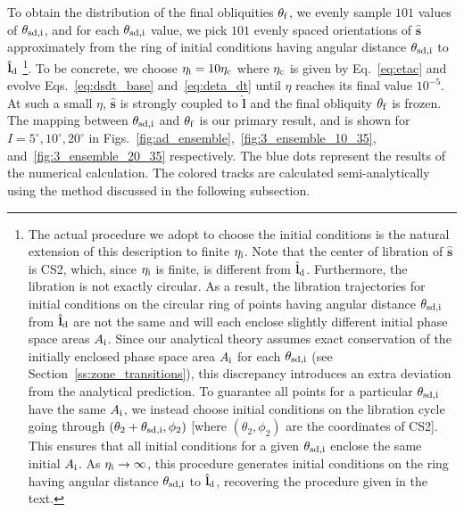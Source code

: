\documentclass[
        fleqn,
        usenatbib,
    ]{mnras}
\newcommand*{\bm}[1]{\boldsymbol{\mathbf{#1}}}
\newcommand*{\uv}[1]{\hat{\bm{#1}}}
\newcommand*{\p}[1]{\left(#1\right)}
\begin{document}
To obtain the distribution of the final obliquities $\theta_{\rm f}$, we evenly
sample $101$ values of $\theta_{\rm sd, i}$, and for each $\theta_{\rm sd, i}$
value, we pick $101$ evenly spaced orientations of $\uv{s}$ approximately from
the ring of initial conditions having angular distance $\theta_{\rm sd, i}$ to
$\uv{l}_{\rm d}$%
%
\footnote{The actual procedure we adopt to choose the initial conditions is the
natural extension of this description to finite $\eta_{\rm i}$. Note that the
center of libration of $\uv{s}$ is CS2, which, since $\eta_{\rm i}$ is finite,
is different from $\uv{l}_{\rm d}$. Furthermore, the libration is not exactly
circular. As a result, the libration trajectories for initial conditions on the
circular ring of points having angular distance $\theta_{\rm sd, i}$ from
$\uv{l}_{\rm d}$ are not the same and will each enclose slightly different
initial phase space areas $A_{\rm i}$. Since our analytical theory assumes exact
conservation of the initially enclosed phase space area $A_{\rm i}$ for each
$\theta_{\rm sd, i}$ (see Section~\ref{ss:zone_transitions}), this discrepancy
introduces an extra deviation from the analytical prediction. To guarantee all
points for a particular $\theta_{\rm sd, i}$ have the same $A_{\rm i}$, we
instead choose initial conditions on the libration cycle going through
$\p{\theta_2 + \theta_{\rm sd, i}, \phi_2}$ [where $\p{\theta_2, \phi_2}$ are
the coordinates of CS2]. This ensures that all initial conditions for a given
$\theta_{\rm sd, i}$ enclose the same initial $A_{\rm i}$. As $\eta_{\rm i} \to
\infty$, this procedure generates initial conditions on the ring having angular
distance $\theta_{\rm sd, i}$ to $\uv{l}_{\rm d}$, recovering the procedure
given in the text.}.
%
To be concrete, we choose $\eta_{\rm i} = 10\eta_{\rm c}$ where $\eta_{\rm c}$
is given by Eq.~\eqref{eq:etac} and evolve Eqs.~\eqref{eq:dsdt_base}
and~\eqref{eq:deta_dt} until $\eta$ reaches its final value $10^{-5}$. At such a
small $\eta$, $\uv{s}$ is strongly coupled to $\uv{l}$ and the final obliquity
$\theta_{\rm f}$ is frozen. The mapping between $\theta_{\rm sd, i}$ and
$\theta_{\rm f}$ is our primary result, and is shown for $I = 5^\circ, 10^\circ,
20^\circ$ in Figs.~\ref{fig:ad_ensemble},~\ref{fig:3_ensemble_10_35},
and~\ref{fig:3_ensemble_20_35} respectively. The blue dots represent the results
of the numerical calculation. The colored tracks are calculated
semi-analytically using the method discussed in the following subsection.
\end{document}
